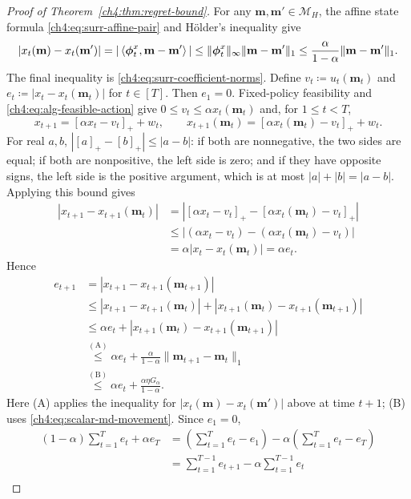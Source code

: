 \begin{proof}[Proof of Theorem~\ref{ch4:thm:regret-bound}]
For any $\mathbf m,\mathbf m'\in\mathcal M_H$, the affine state formula
\eqref{ch4:eq:surr-affine-pair} and H\"older's inequality give
\[
|x_t(\mathbf m)-x_t(\mathbf m')|
=|\left\langle \boldsymbol\phi_t^x,\mathbf m-\mathbf m' \right\rangle|
\le\|\boldsymbol\phi_t^x\|_\infty\|\mathbf m-\mathbf m'\|_1
\le\frac{\alpha}{1-\alpha}\|\mathbf m-\mathbf m'\|_1.
\]
The final inequality is \eqref{ch4:eq:surr-coefficient-norms}.
Define $v_t\coloneqq u_t(\mathbf m_t)$ and
$e_t\coloneqq|x_t-x_t(\mathbf m_t)|$ for $t\in[T]$. Then $e_1=0$.
Fixed-policy feasibility and \eqref{ch4:eq:alg-feasible-action} give
$0\le v_t\le\alpha x_t(\mathbf m_t)$ and, for $1\le t<T$,
\[
x_{t+1}=[\alpha x_t-v_t]_++w_t,
\qquad
x_{t+1}(\mathbf m_t)=[\alpha x_t(\mathbf m_t)-v_t]_++w_t.
\]
For real $a,b$, $|[a]_+-[b]_+|\le|a-b|$: if both are nonnegative,
the two sides are equal; if both are nonpositive, the left side is zero;
and if they have opposite signs, the left side is the positive argument,
which is at most $|a|+|b|=|a-b|$. Applying this bound gives
\[
\begin{aligned}
|x_{t+1}-x_{t+1}(\mathbf m_t)|
&=|[\alpha x_t-v_t]_+-[\alpha x_t(\mathbf m_t)-v_t]_+|\\
&\le|(\alpha x_t-v_t)-(\alpha x_t(\mathbf m_t)-v_t)|\\
&=\alpha|x_t-x_t(\mathbf m_t)|=\alpha e_t.
\end{aligned}
\]
Hence
\begin{equation}
\label{ch4:eq:scalar-tracking-recursion}
\begin{aligned}
e_{t+1}
&=|x_{t+1}-x_{t+1}(\mathbf m_{t+1})|\\
&\le |x_{t+1}-x_{t+1}(\mathbf m_t)|
     +|x_{t+1}(\mathbf m_t)-x_{t+1}(\mathbf m_{t+1})|\\
&\le\alpha e_t
     +|x_{t+1}(\mathbf m_t)-x_{t+1}(\mathbf m_{t+1})|\\
&\overset{\mathrm{(A)}}{\le}\alpha e_t
    +\frac{\alpha}{1-\alpha}\|\mathbf m_{t+1}-\mathbf m_t\|_1\\
&\overset{\mathrm{(B)}}{\le}\alpha e_t+\frac{\alpha\eta G_\alpha}{1-\alpha}.
\end{aligned}
\end{equation}
Here (A) applies the inequality for
$|x_t(\mathbf m)-x_t(\mathbf m')|$ above at time $t+1$;
(B) uses \eqref{ch4:eq:scalar-md-movement}. Since $e_1=0$,
\[
\begin{aligned}
(1-\alpha)\sum_{t=1}^T e_t+\alpha e_T
&=\left(\sum_{t=1}^T e_t-e_1\right)
 -\alpha\left(\sum_{t=1}^T e_t-e_T\right)\\
&=\sum_{t=1}^{T-1}e_{t+1}-\alpha\sum_{t=1}^{T-1}e_t\\

\end{aligned}\]
\end{proof}

